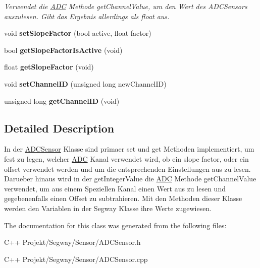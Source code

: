 \begin{DoxyCompactItemize}
\begin{DoxyCompactList}\small\item\em Verwendet die \hyperlink{class_a_d_c}{A\+D\+C} Methode get\+Channel\+Value, um den Wert des A\+D\+C\+Sensors auszulesen. Gibt das Ergebnis allerdings als float aus. \end{DoxyCompactList}\item 
\hypertarget{class_a_d_c_sensor_af16a503fd5e4265afc6d80f940aea64f}{}void {\bfseries set\+Slope\+Factor} (bool active, float factor)\label{class_a_d_c_sensor_af16a503fd5e4265afc6d80f940aea64f}

\item 
\hypertarget{class_a_d_c_sensor_a83aad50bdb927b68553098553cf7e8eb}{}bool {\bfseries get\+Slope\+Factor\+Is\+Active} (void)\label{class_a_d_c_sensor_a83aad50bdb927b68553098553cf7e8eb}

\item 
\hypertarget{class_a_d_c_sensor_a844fda46abdfe798a657605468bf9a39}{}float {\bfseries get\+Slope\+Factor} (void)\label{class_a_d_c_sensor_a844fda46abdfe798a657605468bf9a39}

\item 
\hypertarget{class_a_d_c_sensor_aedcf4a6cccdd2ce684db7021b6cf0e92}{}void {\bfseries set\+Channel\+I\+D} (unsigned long new\+Channel\+I\+D)\label{class_a_d_c_sensor_aedcf4a6cccdd2ce684db7021b6cf0e92}

\item 
\hypertarget{class_a_d_c_sensor_afd585136944657343937a6ee846c3139}{}unsigned long {\bfseries get\+Channel\+I\+D} (void)\label{class_a_d_c_sensor_afd585136944657343937a6ee846c3139}

\end{DoxyCompactItemize}


\subsection{Detailed Description}
In der \hyperlink{class_a_d_c_sensor}{A\+D\+C\+Sensor} Klasse sind primaer set und get Methoden implementiert, um fest zu legen, welcher \hyperlink{class_a_d_c}{A\+D\+C} Kanal verwendet wird, ob ein slope factor, oder ein offset verwendet werden und um die entsprechenden Einstellungen aus zu lesen. Darueber hinaus wird in der get\+Integer\+Value die \hyperlink{class_a_d_c}{A\+D\+C} Methode get\+Channel\+Value verwendet, um aus einem Speziellen Kanal einen Wert aus zu lesen und gegebenenfalls einen Offset zu subtrahieren. Mit den Methoden dieser Klasse werden den Variablen in der Segway Klasse ihre Werte zugewiesen. 



The documentation for this class was generated from the following files\+:\begin{DoxyCompactItemize}
\item 
C++ Projekt/\+Segway/\+Sensor/A\+D\+C\+Sensor.\+h\item 
C++ Projekt/\+Segway/\+Sensor/A\+D\+C\+Sensor.\+cpp\end{DoxyCompactItemize}
